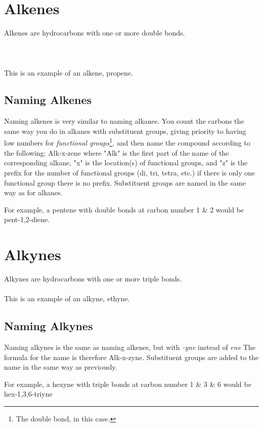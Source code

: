 \documentclass[11pt,twoside]{article}
\begin{document}
	\tableofcontents
	
	\section{Alkenes}
		Alkenes are hydrocarbons with one or more double bonds.
		\\ \\
		\\ \\
		This is an example of an alkene, propene.
		\subsection{Naming Alkenes}
			Naming alkenes is very similar to naming alkanes. You count the carbons the same way you do in alkanes with substituent groups, giving priority to having low numbers for \emph{functional groups}\footnote{The double bond, in this case.}, and then name the compound according to the following: Alk-x-zene where "Alk" is the first part of the name of the corresponding alkane, "x" is the location(s) of functional groups, and "z" is the prefix for the number of functional groups (di, tri, tetra, etc.) if there is only one functional group there is no prefix. Substituent groups are named in the same way as for alkanes.
			
			For example, a pentene with double bonds at carbon number 1 \& 2 would be pent-1,2-diene. 
			
	\section{Alkynes}
		Alkynes are hydrocarbons with one or more triple bonds.
		\\
		\\
		This is an example of an alkyne, ethyne.
		\subsection{Naming Alkynes}
			Naming alkynes is the same as naming alkenes, but with \emph{-yne} instead of \emph{ene} The formula for the name is therefore Alk-x-zyne. Substituent groups are added to the name in the same way as previously.
			
			For example, a hexyne with triple bonds at carbon number 1 \& 3 \& 6 would be hex-1,3,6-triyne
\end{document}
